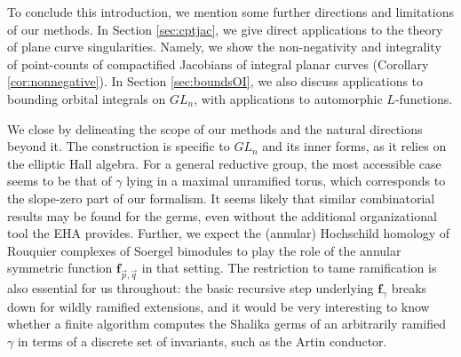 \documentclass{amsart}
\numberwithin{equation}{section}
\theoremstyle{definition}
\newtheorem{remark}[lemma]{Remark}%
\def\tilde{\widetilde}
\newcommand{\tH}{\widetilde{H}}
\renewcommand{\th}{\tilde{h}}
\newcommand{\frs}{\mathbf{f}_{\vec{p},\vec{q}}}
\newcommand{\fpq}{\frs}
\newcommand{\fgamma}{\mathbf{f}_{\gamma}}
\newcommand{\fixme}[1]{{{\color{blue}{[#1]}}}}
\begin{document}
%

To conclude this introduction, we mention some further directions and limitations of our methods. In Section \ref{sec:cptjac}, we give direct applications to the theory of plane curve singularities. Namely, we show the non-negativity and integrality of point-counts of compactified Jacobians of integral planar curves (Corollary \ref{cor:nonnegative}). In Section \ref{sec:boundsOI}, we also discuss applications to bounding orbital integrals on $GL_n$, with applications to automorphic $L$-functions. 

We close by delineating the scope of our methods and the natural directions beyond it. The construction is specific to $GL_n$ and its inner forms, as it relies on the elliptic Hall algebra. For a general reductive group, the most accessible case seems to be that of $\gamma$ lying in a maximal unramified torus, which corresponds to the slope-zero part of our formalism. It seems likely that similar combinatorial results may be found for the germs, even without the additional organizational tool the EHA provides. Further, we expect the (annular) Hochschild homology of Rouquier complexes of Soergel bimodules to play the role of the annular symmetric function $\fpq$ in that setting. The restriction to tame ramification is also essential for us throughout: the basic recursive step underlying $\fgamma$ breaks down for wildly ramified extensions, and it would be very interesting to know whether a finite algorithm computes the Shalika germs of an arbitrarily ramified $\gamma$ in terms of a discrete set of invariants, such as the Artin conductor.
\end{document}
